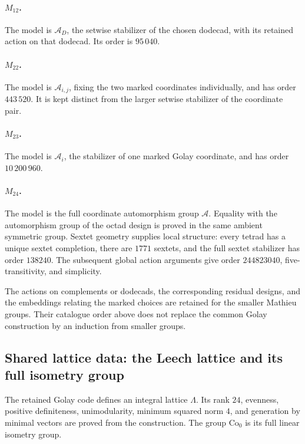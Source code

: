 \documentclass[11pt]{article}
\numberwithin{equation}{section}
\theoremstyle{definition}
\newcommand{\Co}{\mathrm{Co}}
\begin{document}
\paragraph{\texorpdfstring{$M_{12}$}{M12}.}
The model is $\mathcal A_D$, the setwise stabilizer of the chosen
dodecad, with its retained action on that dodecad. Its order is
$95\,040$.

\paragraph{\texorpdfstring{$M_{22}$}{M22}.}
The model is $\mathcal A_{i,j}$, fixing the two marked coordinates
individually, and has order $443\,520$. It is kept distinct from
the larger setwise stabilizer of the coordinate pair.

\paragraph{\texorpdfstring{$M_{23}$}{M23}.}
The model is $\mathcal A_i$, the stabilizer of one marked Golay
coordinate, and has order $10\,200\,960$.

\paragraph{\texorpdfstring{$M_{24}$}{M24}.}
The model is the full coordinate automorphism group $\mathcal A$.
Equality with the automorphism group of the octad design is proved
in the same ambient symmetric group. Sextet geometry supplies local
structure: every tetrad has a unique sextet completion, there are
$1771$ sextets, and the full sextet stabilizer has order $138240$.
The subsequent global action arguments give order $244823040$,
five-transitivity, and simplicity.

The actions on complements or dodecads, the corresponding residual
designs, and the embeddings relating the marked choices are retained
for the smaller Mathieu groups. Their catalogue order above does not
replace the common Golay construction by an induction from smaller
groups.

\subsection{Shared lattice data: the Leech lattice and its full isometry group}\label{sec:leech-data}

The retained Golay code defines an integral lattice $\Lambda$.
Its rank $24$, evenness, positive definiteness, unimodularity, minimum
squared norm $4$, and generation by minimal vectors are proved from the
construction. The group $\Co_0$ is its full linear isometry group.
\end{document}
